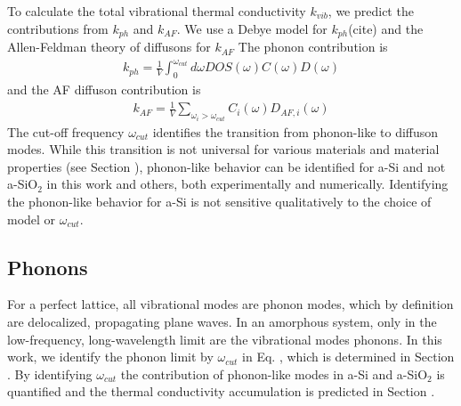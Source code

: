 \documentclass[aps,prb,twocolumn,superscriptaddress,footinbib,amsmath,amssymb,floatfix]{revtex4}
\begin{document}
To calculate the total vibrational thermal conductivity $k_{vib}$, we predict 
the contributions from $k_{ph}$ and $k_{AF}$. We use a Debye model 
for $k_{ph}$(cite) and the Allen-Feldman theory of diffusons 
for $k_{AF}$\cite{feldman_thermal_1993,feldman_numerical_1999}
The phonon contribution is
\begin{equation}\label{EQ:kph}
\begin{split}
k_{ph} = \frac{1}{V}\int_{0}^{\omega_{cut}} 
d\omega DOS(\omega) C(\omega) D(\omega)
\end{split}
\end{equation}
and the AF diffuson contribution is
\begin{equation}\label{EQ:kAF}
\begin{split}
k_{AF} = \frac{1}{V}\sum_{\omega_i>\omega_{cut}} C_i(\omega) D_{AF,i}(\omega) 
\end{split}
\end{equation}
The cut-off frequency $\omega_{cut}$ identifies the transition from 
phonon-like to diffuson modes.
\cite{feldman_thermal_1993,feldman_numerical_1999,liu_high_2009} 
While this transition is not universal for 
various materials and material properties (see Section ), 
phonon-like behavior 
can be identified for a-Si and not a-SiO$_2$ in this work and others, 
both experimentally
\cite{liu_high_2009,yang_anomalously_2010,minnich_thermal_2011,
regner_broadband_2013} 
and numerically.
\cite{feldman_thermal_1993,feldman_numerical_1999,
mcgaughey_thermal_2004,he_heat_2011} 
Identifying the phonon-like behavior for a-Si is not sensitive 
qualitatively to the choice of model
\cite{feldman_thermal_1993,feldman_numerical_1999,liu_high_2009} 
or $\omega_{cut}$.
\cite{feldman_thermal_1993,feldman_numerical_1999,
donadio_atomistic_2009,liu_high_2009,yang_anomalously_2010}

\subsection{\label{S:Theory:Thermal:Phonons}Phonons}

For a perfect lattice, 
all vibrational modes are phonon modes, which by 
definition are delocalized, propagating plane waves.
\cite{ziman_electrons_2001} In an amorphous system, only in the 
low-frequency, long-wavelength limit are the vibrational modes phonons. 
In this work, we identify the phonon limit by $\omega_{cut}$ in Eq. , 
which is determined in Section . By identifying $\omega_{cut}$  
the contribution of phonon-like modes in a-Si and 
a-SiO$_2$ is quantified and the thermal conductivity accumulation 
is predicted in Section .  
\end{document}
